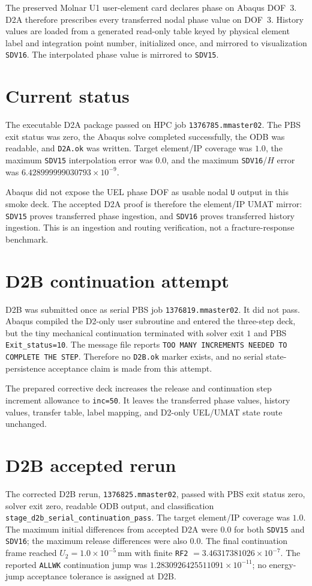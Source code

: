 The preserved Molnar U1 user-element card declares phase on Abaqus DOF~3. D2A
therefore prescribes every transferred nodal phase value on DOF~3. History
values are loaded from a generated read-only table keyed by physical element
label and integration point number, initialized once, and mirrored to
visualization \texttt{SDV16}. The interpolated phase value is mirrored to
\texttt{SDV15}.

\section{Current status}
The executable D2A package passed on HPC job \texttt{1376785.mmaster02}. The
PBS exit status was zero, the Abaqus solve completed successfully, the ODB was
readable, and \texttt{D2A.ok} was written. Target element/IP coverage was
$1.0$, the maximum \texttt{SDV15} interpolation error was $0.0$, and the
maximum \texttt{SDV16}/$H$ error was
$6.428999999030793\times10^{-9}$.

Abaqus did not expose the UEL phase DOF as usable nodal \texttt{U} output in
this smoke deck. The accepted D2A proof is therefore the element/IP UMAT mirror:
\texttt{SDV15} proves transferred phase ingestion, and \texttt{SDV16} proves
transferred history ingestion. This is an ingestion and routing verification,
not a fracture-response benchmark.

\section{D2B continuation attempt}
D2B was submitted once as serial PBS job \texttt{1376819.mmaster02}. It did
not pass. Abaqus compiled the D2-only user subroutine and entered the three-step
deck, but the tiny mechanical continuation terminated with solver exit $1$ and
PBS \texttt{Exit\_status=10}. The message file reports
\texttt{TOO MANY INCREMENTS NEEDED TO COMPLETE THE STEP}. Therefore no
\texttt{D2B.ok} marker exists, and no serial state-persistence acceptance claim
is made from this attempt.

The prepared corrective deck increases the release and continuation step
increment allowance to \texttt{inc=50}. It leaves the transferred phase values,
history values, transfer table, label mapping, and D2-only UEL/UMAT state route
unchanged.

\section{D2B accepted rerun}
The corrected D2B rerun, \texttt{1376825.mmaster02}, passed with PBS exit
status zero, solver exit zero, readable ODB output, and classification
\texttt{stage\_d2b\_serial\_continuation\_pass}. The target element/IP
coverage was $1.0$. The maximum initial differences from accepted D2A were
$0.0$ for both \texttt{SDV15} and \texttt{SDV16}; the maximum release
differences were also $0.0$. The final continuation frame reached
$U_2=1.0\times10^{-5}\,\mathrm{mm}$ with finite \texttt{RF2}
$=3.46317381026\times10^{-7}$. The reported \texttt{ALLWK} continuation jump was
$1.2830926425511091\times10^{-11}$; no energy-jump acceptance tolerance is
assigned at D2B.

